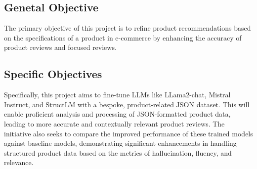 \subsection*{Genetal Objective}
The primary objective of this project is to refine product recommendations based on the specifications of a product in e-commerce by enhancing the accuracy of product reviews and focused reviews. 
\subsection*{Specific Objectives}
Specifically, this project aims to fine-tune LLMs like LLama2-chat, Mistral Instruct, and StructLM with a bespoke, product-related JSON dataset. This will enable proficient analysis and processing of JSON-formatted product data, leading to more accurate and contextually relevant product reviews. The initiative also seeks to compare the improved performance of these trained models against baseline models, demonstrating significant enhancements in handling structured product data based on the metrics of hallucination, fluency, and relevance.
